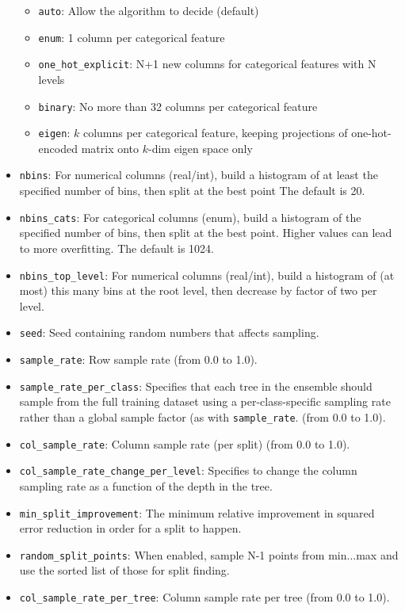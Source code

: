 \begin{itemize}
\begin{itemize}
\item \texttt{auto}: Allow the algorithm to decide (default)
\item \texttt{enum}: 1 column per categorical feature
\item \texttt{one\_hot\_explicit}: N+1 new columns for categorical features with N levels
\item \texttt{binary}: No more than 32 columns per categorical feature
\item \texttt{eigen}: $k$ columns per categorical feature, keeping projections of one-hot-encoded matrix onto $k$-dim eigen space only
\end{itemize}
\item {\texttt{nbins}}: For numerical columns (real/int), build a histogram of at least the specified number of bins, then split at the best point The default is 20.
\item {\texttt{nbins\_cats}}: For categorical columns (enum), build a histogram of the specified number of bins, then split at the best point. Higher values can lead to more overfitting.  The default is 1024. \label{nbins_cats}
\item {\texttt{nbins\_top\_level}}: For numerical columns (real/int), build a histogram of (at most) this many bins at the root level, then decrease by factor of two per level.
\item {\texttt{seed}}: Seed containing random numbers that affects sampling.
\item {\texttt{sample\_rate}}: Row sample rate (from 0.0 to 1.0). 
\item {\texttt{sample\_rate\_per\_class}}: Specifies that each tree in the ensemble should sample from the full training dataset using a per-class-specific sampling rate rather than a global sample factor (as with {\texttt{sample\_rate}}. (from 0.0 to 1.0). 
\item {\texttt{col\_sample\_rate}}: Column sample rate (per split) (from 0.0 to 1.0). 
\item {\texttt{col\_sample\_rate\_change\_per\_level}}: Specifies to change the column sampling rate as a function of the depth in the tree.
\item {\texttt{min\_split\_improvement}}: The minimum relative improvement in squared error reduction in order for a split to happen. 
\item {\texttt{random\_split\_points}}: When enabled, sample N-1 points from min...max and use the sorted list of those for split finding. 
\item {\texttt{col\_sample\_rate\_per\_tree}}: Column sample rate per tree (from 0.0 to 1.0). 

\end{itemize}
